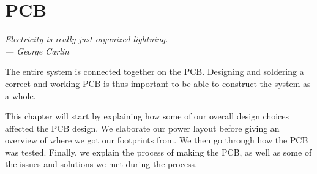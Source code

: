 \chapter{PCB}\label{ch:pcb}

\begin{flushright}{\slshape
    Electricity is really just organized lightning.\\ \medskip
    --- George Carlin}
\end{flushright}


The entire system is connected together on the PCB. Designing and soldering
a correct and working PCB is thus important to be able to construct the system
as a whole.

This chapter will start by explaining how some of our overall design choices
affected the PCB design. We elaborate our power layout before giving an
overview of where we got our footprints from. We then go through how the PCB was
tested. Finally, we explain the process of making the PCB, as well as some of
the issues and solutions we met during the process.



%



%



